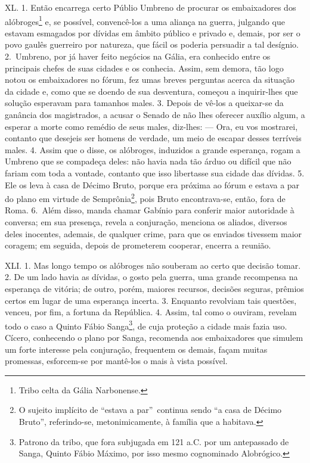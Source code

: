 XL. 1. Então encarrega certo Públio Umbreno de procurar os embaixadores dos
alóbroges\footnote{Tribo celta da Gália Narbonense.} e, se possível,
convencê-los a uma aliança na guerra, julgando que estavam esmagados por
dívidas em âmbito público e privado e, demais, por ser o povo gaulês guerreiro
por natureza, que fácil os poderia persuadir a tal desígnio. 2.~Umbreno, por já
haver feito negócios na Gália, era conhecido entre os principais chefes de suas
cidades e os conhecia. Assim, sem demora, tão logo notou os embaixadores no
fórum, fez umas breves perguntas acerca da situação da cidade e, como que se
doendo de sua desventura, começou a inquirir-lhes que solução esperavam para
tamanhos males. 3. Depois de vê-los a queixar-se da ganância dos magistrados, a
acusar o Senado de não lhes oferecer auxílio algum, a esperar a morte como
remédio de seus males, diz-lhes: --- Ora, eu vos mostrarei, contanto que
desejeis ser homens de verdade, um meio de escapar desses terríveis males. 4.
Assim que o disse, os alóbroges, induzidos a grande esperança, rogam a Umbreno
que se compadeça deles: não havia nada tão árduo ou difícil que não fariam com
toda a  vontade, contanto que isso libertasse sua cidade das dívidas. 5. Ele os
leva à casa de Décimo Bruto, porque era próxima ao fórum e estava a par do
plano em virtude de Semprônia\footnote{O sujeito implícito de ``estava a par''\
continua sendo ``a casa de Décimo Bruto'', referindo-se, metonimicamente, à família que a habitava.}, pois Bruto encontrava-se, então,
fora de Roma. 6.~Além disso, manda chamar Gabínio para conferir maior
autoridade à conversa; em sua presença, revela a conjuração, menciona os
aliados, diversos deles inocentes, ademais, de qualquer crime, para que os
enviados tivessem maior coragem; em seguida, depois de prometerem cooperar,
encerra a reunião. 

XLI. 1. Mas longo tempo os alóbroges não souberam ao certo que decisão tomar.
2. De um lado havia as dívidas, o gosto pela guerra, uma grande recompensa na
esperança de vitória; de outro, porém, maiores recursos, decisões seguras,
prêmios certos em lugar de uma esperança incerta. 3. Enquanto revolviam tais
questões, venceu, por fim, a fortuna da República. 4. Assim, tal como o
ouviram, revelam todo o caso a Quinto Fábio Sanga\footnote{Patrono da tribo,
que fora subjugada em 121 a.C. por um antepassado de Sanga, Quinto Fábio
Máximo, por isso mesmo cognominado Alobrógico.}, de cuja proteção a cidade mais
fazia uso. Cícero, conhecendo o plano por Sanga, recomenda aos embaixadores que
simulem um forte interesse pela conjuração, frequentem os demais, façam
muitas promessas, esforcem-se por mantê-los o mais à vista possível.

